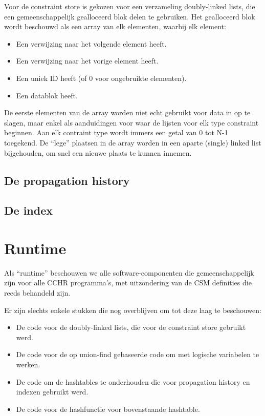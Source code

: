 Voor de constraint store is gekozen voor een verzameling doubly-linked lists, die een gemeenschappelijk gealloceerd blok delen te gebruiken. Het gealloceerd blok wordt beschouwd als een array van elk elementen, waarbij elk element: \begin{itemize}
  \item Een verwijzing naar het volgende element heeft.
  \item Een verwijzing naar het vorige element heeft.
  \item Een uniek ID heeft (of $0$ voor ongebruikte elementen).
  \item Een datablok heeft.
\end{itemize}
De eerste elementen van de array worden niet echt gebruikt voor data in op te slagen, maar enkel als aanduidingen voor waar de lijsten voor elk type constraint beginnen. Aan elk contraint type wordt immers een getal van 0 tot N-1 toegekend.
De ``lege'' plaatsen in de array worden in een aparte (single) linked list bijgehouden, om snel een nieuwe plaats te kunnen innemen. 

\subsection{De propagation history} \label{ssec:impl-csm-ph}

\subsection{De index} \label{ssec:inpl-csm-index}

\section{Runtime} \label{sec:impl-rt}

Als ``runtime'' beschouwen we alle software-componenten die gemeenschappelijk zijn voor alle CCHR programma's, met uitzondering van de CSM definities die reeds behandeld zijn.

Er zijn slechts enkele stukken die nog overblijven om tot deze laag te beschouwen: \begin{itemize}
  \item De code voor de doubly-linked lists, die voor de constraint store gebruikt werd.
  \item De code voor de op union-find gebaseerde code om met logische variabelen te werken.
  \item De code om de hashtables te onderhouden die voor propagation history en indexen gebruikt werd.
  \item De code voor de hashfunctie voor bovenstaande hashtable.
\end{itemize}

